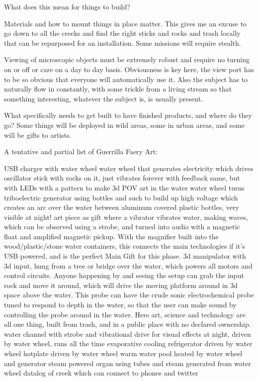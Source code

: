What does this mean for things to build?

Materials and how to mount things in place matter. This gives me an
excuse to go down to all the creeks and find the right sticks and rocks
and trash locally that can be repurposed for an installation. Some
missions will require stealth.

Viewing of microscopic objects must be extremely robust and require no
turning on or off or care on a day to day basis. Obviousness is key
here, the view port has to be so obvious that everyone will
automatically use it. Also the subject has to naturally flow in
constantly, with some trickle from a living stream so that something
interesting, whatever the subject is, is usually present.

What specifically needs to get built to have finished products, and
where do they go? Some things will be deployed in wild areas, some in
urban areas, and some will be gifts to artists.

A tentative and partial list of Guerrilla Faery Art:

USB charger with water wheel water wheel that generates electricity
which drives oscillator stick with rocks on it, just vibrates forever
with feedback same, but with LEDs with a pattern to make 3d POV art in
the water water wheel turns triboelectric generator using bottles and
such to build up high voltage which creates an arc over the water
between aluminum covered plastic bottles, very visible at night! art
piece as gift where a vibrator vibrates water, making waves, which can
be observed using a strobe, and turned into audio with a magnetic float
and amplified magnetic pickup. With the magnifier built into the
wood/plastic/stone water containers, this connects the main technologies
if it's USB powered, and is the perfect Main Gift for this phase. 3d
manipulator with 3d input, hung from a tree or bridge over the water,
which powers all motors and control circuits. Anyone happening by and
seeing the setup can grab the input rock and move it around, which will
drive the moving platform around in 3d space above the water. This probe
can have the crude sonic electrochemical probe tuned to respond to depth
in the water, so that the user can make sound by controlling the probe
around in the water. Here art, science and technology are all one thing,
built from trash, and in a public place with no declared ownership.
water channel with strobe and vibrational drive for visual effects at
night, driven by water wheel, runs all the time evaporative cooling
refrigerator driven by water wheel hotplate driven by water wheel warm
water pool heated by water wheel and generator steam powered organ using
tubes and steam generated from water wheel datalog of creek which can
connect to phones and twitter

